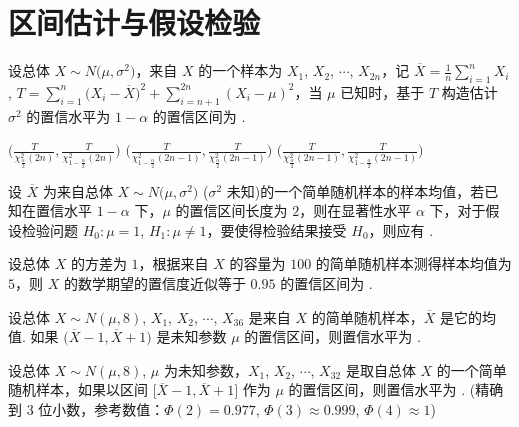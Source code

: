 \section{区间估计与假设检验}
	\begin{titwo}
		设总体 $X \sim N \bigl( \mu,\sigma^{2} \bigr)$，来自 $X$ 的一个样本为 $X_{1}$, $X_{2}$, $\cdots$, $X_{2n}$，记 $\overline{X} = \frac{1}{n} \sum_{i=1}^{n} X_{i}$, $T = \sum_{i=1}^{n} \bigl( X_{i} - \overline{X} \bigr)^{2} + \sum_{i=n+1}^{2n} (X_{i} - \mu)^{2}$，当 $\mu$ 已知时，基于 $T$ 构造估计 $\sigma^{2}$ 的置信水平为 $1 - \alpha$ 的置信区间为 \kuo.

		{$\Biggl( \frac{T}{\chi_{\frac{\alpha}{2}}^{2}(2n)}, \frac{T}{\chi_{1 - \frac{\alpha}{2}}^{2} (2n) } \Biggr)$}%
		{$\Biggl( \frac{T}{\chi_{1 - \frac{\alpha}{2}}^{2}(2n-1)}, \frac{T}{\chi_{\frac{\alpha}{2}}^{2} (2n-1) } \Biggr)$}%
		{$\Biggl( \frac{T}{\chi_{\frac{\alpha}{2}}^{2}(2n-1)}, \frac{T}{\chi_{1 - \frac{\alpha}{2}}^{2} (2n-1) } \Biggr)$}
	\end{titwo}

	\begin{titwo}
		设 $\overline{X}$ 为来自总体 $X \sim N \bigl( \mu,\sigma^{2} \bigr)$ ($\sigma^{2}$ 未知)的一个简单随机样本的样本均值，若已知在置信水平 $1 - \alpha$ 下，$\mu$ 的置信区间长度为 $2$，则在显著性水平 $\alpha$ 下，对于假设检验问题 $H_{0}: \mu = 1$, $H_{1}: \mu \ne 1$，要使得检验结果接受 $H_{0}$，则应有 \kuo.

		\twoch{$\overline{X} \in (-1,1)$}{$\overline{X} \in (-1,3)$}{$\overline{X} \in (-2,2)$}{$\overline{X} \in (0,2)$}
	\end{titwo}

	\begin{titwo}
		设总体 $X$ 的方差为 $1$，根据来自 $X$ 的容量为 $100$ 的简单随机样本测得样本均值为 $5$，则 $X$ 的数学期望的置信度近似等于 $0.95$ 的置信区间为 \htwo.
	\end{titwo}

	\begin{titwo}
		设总体 $X \sim N(\mu,8)$, $X_{1}$, $X_{2}$, $\cdots$, $X_{36}$ 是来自 $X$ 的简单随机样本，$\overline{X}$ 是它的均值. 如果 $\bigl( \overline{X} - 1,\overline{X} + 1 \bigr)$ 是未知参数 $\mu$ 的置信区间，则置信水平为 \htwo.
	\end{titwo}

	\begin{titwo}
		设总体 $X \sim N(\mu,8)$, $\mu$ 为未知参数，$X_{1}$, $X_{2}$, $\cdots$, $X_{32}$ 是取自总体 $X$ 的一个简单随机样本，如果以区间 $\bigl[ \overline{X} - 1,\overline{X} + 1 \bigr]$ 作为 $\mu$ 的置信区间，则置信水平为 \htwo. (精确到 $3$ 位小数，参考数值：$\varPhi(2) = 0.977$, $\varPhi(3) \approx 0.999$, $\varPhi(4) \approx 1$)
	\end{titwo}

